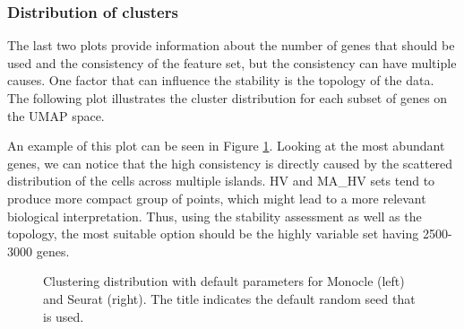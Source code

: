 \subsubsection{Distribution of clusters}
The last two plots provide information about the number of genes that should be used and the consistency of the feature set, but the consistency can have multiple causes. One factor that can influence the stability is the topology of the data. The following plot illustrates the cluster distribution for each subset of genes on the UMAP space.

An example of this plot can be seen in Figure \ref{fig:ca-feat-cluster}. Looking at the most abundant genes, we can notice that the high consistency is directly caused by the scattered distribution of the cells across multiple islands. HV and MA\_HV sets tend to produce more compact group of points, which might lead to a more relevant biological interpretation. Thus, using the stability assessment as well as the topology, the most suitable option should be the highly variable set having 2500-3000 genes.

\begin{figure}[H]
    \centering
    \caption{\label{fig:ca-feat-cluster}Clustering distribution with default parameters for Monocle (left) and Seurat (right). The title indicates the default random seed that is used.}
\end{figure}

